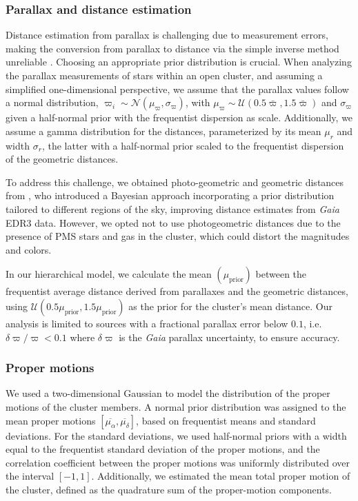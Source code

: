 \documentclass{aa}
\begin{document}
\subsubsection{Parallax and distance estimation}
Distance estimation from parallax is challenging due to measurement errors, making the conversion from parallax to distance via the simple inverse method unreliable \citep{2015PASP..127..994B,2021AJ....161..147B}. Choosing an appropriate prior distribution is crucial. When analyzing the parallax measurements of stars within an open cluster, and assuming a simplified one-dimensional perspective, we assume that the parallax values follow a normal distribution, $\varpi_i \sim \mathcal{N}(\mu_\varpi,\sigma_\varpi)$, with $\mu_\varpi \sim \mathcal{U}(0.5\bar{\varpi},1.5\bar{\varpi})$ and $\sigma_\varpi$ given a half-normal prior with the frequentist dispersion as scale. Additionally, we assume a gamma distribution for the distances, parameterized by its mean $\mu_r$ and width $\sigma_r$, the latter with a half-normal prior scaled to the frequentist dispersion of the geometric distances.

To address this challenge, we obtained photo-geometric and geometric distances from \citet{2021AJ....161..147B}, who introduced a Bayesian approach incorporating a prior distribution tailored to different regions of the sky, improving distance estimates from \textit{Gaia} EDR3 data. However, we opted not to use photogeometric distances due to the presence of PMS stars and gas in the cluster, which could distort the magnitudes and colors.

In our hierarchical model, we calculate the mean $(\mu_{\mathrm{prior}})$ between the frequentist average distance derived from parallaxes and the \citet{2021AJ....161..147B} geometric distances, using $\mathcal{U}(0.5\mu_{\mathrm{prior}},1.5\mu_{\mathrm{prior}})$ as the prior for the cluster's mean distance. Our analysis is limited to sources with a fractional parallax error below $0.1$, i.e. $\delta\varpi/\varpi<0.1$ where $\delta\varpi$ is the \textit{Gaia} parallax uncertainty, to ensure accuracy.

\subsubsection{Proper motions}
We used a two-dimensional Gaussian to model the distribution of the proper motions of the cluster members. A normal prior distribution was assigned to the mean proper motions $\left[\overline{\mu_\alpha},\overline{\mu_\delta}\right]$, based on frequentist means and standard deviations. For the standard deviations, we used half-normal priors with a width equal to the frequentist standard deviation of the proper motions, and the correlation coefficient between the proper motions was uniformly distributed over the interval $[-1, 1]$. Additionally, we estimated the mean total proper motion of the cluster, defined as the quadrature sum of the proper-motion components.
\end{document}
